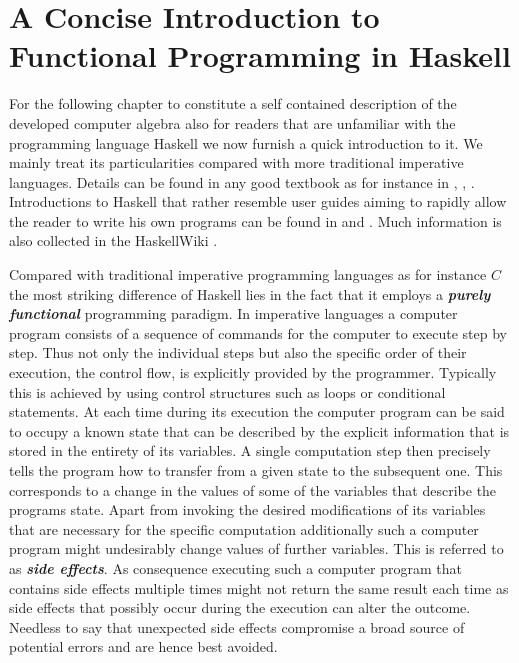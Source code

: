 \documentclass[a4paper,12pt, DIV=14, BCOR=5mm, twoside, headsepline]{scrbook}
\begin{document}
\section{A Concise Introduction to Functional Programming in Haskell}
For the following chapter to constitute a self contained description of the developed computer algebra also for readers that are unfamiliar with the programming language Haskell \cite{Marlow_haskell2010} we now furnish a quick introduction to it. We mainly treat its particularities compared with more traditional imperative languages.
Details can be found in any good textbook as for instance in \cite{Thompson99thecraft}, \cite{bird_2014}, \cite{hutton_2007}. Introductions to Haskell that rather resemble user guides aiming to rapidly allow the reader to write his own programs can be found in  \cite{OSullivan2008} and  \cite{Lipovaca:2011:LYH:2018642}. Much information is also collected in the HaskellWiki \cite{wiki:xxx}.

Compared with traditional imperative programming languages as for instance $C$ the most striking difference of Haskell lies in the fact that it employs a \textbf{\textit{purely functional}} programming paradigm. In imperative languages a computer program consists of a sequence of commands for the computer to execute step by step. Thus not only the individual steps but also the specific order of their execution, the control flow, is explicitly provided by the programmer. Typically this is achieved by using control structures such as loops or conditional statements. At each time during its execution the computer program can be said to occupy a known state that can be described by the explicit information that is stored in the entirety of its variables. A single computation step then precisely tells the program how to transfer from a given state to the subsequent one. This corresponds to a change in the values of some of the variables that describe the programs state. Apart from invoking the desired modifications of its variables that are necessary for the specific computation additionally such a computer program might undesirably change values of further variables. This is referred to as \textit{\textbf{side effects}}. As consequence executing such a computer program that contains side effects multiple times might not return the same result each time as side effects that possibly occur during the execution can alter the outcome. Needless to say that unexpected side effects compromise a broad source of potential errors and are hence best avoided.
\end{document}
